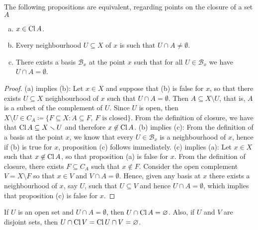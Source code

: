 \begin{proposition}\label{prop: closure equivalent prop}
    The following propositions are equivalent, regarding points on the closure of a
    set \(A\)
    \begin{enumerate}[(a)]\setlength\itemsep{0em}
        \item \(x \in \operatorname{Cl} A\).

        \item Every neighbourhood \(U \subseteq X\) of \(x\) is such that \(U
              \cap A \neq \emptyset\).

        \item There exists a basis \(\mathcal B_x\) at the point \(x\) such that for all
              \(U \in \mathcal B_x\) we have \(U \cap A = \emptyset\).
    \end{enumerate}
\end{proposition}

\begin{proof}
    (a) implies (b): Let \(x \in X\) and suppose that (b) is false for \(x\), so
    that there exists \(U \subseteq X\) neighbourhood of \(x\) such that \(U \cap A
    = \emptyset\). Then \(A \subseteq X \setminus U\), that is, \(A\) is a subset of
    the complement of \(U\). Since \(U\) is open, then \(X \setminus U \in C_A
    \coloneq \{F \subseteq X \colon A \subseteq F,\ F \text{ is closed}\}\). From the
    definition of closure, we have that \(\operatorname{Cl} A \subseteq X \smallsetminus U\) and
    therefore \(x \not\in \operatorname{Cl} A\). (b) implies (c): From the definition of a
    basis at the point \(x\), we know that every \(U \in \mathcal B_x\) is a
    neighbourhood of \(x\), hence if (b) is true for \(x\), proposition (c) follows
    immediately. (c) implies (a): Let \(x \in X\) such that \(x \not\in \operatorname{Cl}
    A\), so that proposition (a) is false for \(x\).  From the definition of
    closure, there exists \(F \subseteq C_A\) such that \(x \not\in F\). Consider
    the open complement \(V = X \setminus F\) so that \(x \in V\) and \(V \cap A =
    \emptyset\). Hence, given any basis at \(x\) there exists a neighbourhood of
    \(x\), say \(U\), such that \(U \subseteq V\) and hence \(U \cap A =
    \emptyset\), which implies that proposition (c) is false for \(x\).
\end{proof}

\begin{corollary}\label{cor: disjoint closure persistence}
    If \(U\) is an open set and \(U \cap A = \emptyset\), then \(U \cap \operatorname{Cl}
    A = \varnothing\). Also, if \(U\) and \(V\) are disjoint sets, then \(U \cap
    \operatorname{Cl} V = \operatorname{Cl} U \cap V = \varnothing\).
\end{corollary}

